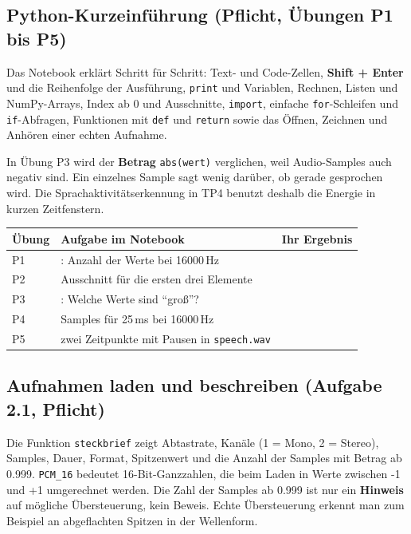 \documentclass[11pt]{article}
\begin{document}
\subsection[Python-Kurzeinführung]{Python-Kurzeinführung (Pflicht, Übungen P1 bis P5)}


Das Notebook erklärt Schritt für Schritt: Text- und Code-Zellen, \textbf{Shift + Enter} und die Reihenfolge der Ausführung, \texttt{print} und Variablen, Rechnen, Listen und NumPy-Arrays, Index ab 0 und Ausschnitte, \texttt{import}, einfache \texttt{for}-Schleifen und \texttt{if}-Abfragen, Funktionen mit \texttt{def} und \texttt{return} sowie das Öffnen, Zeichnen und Anhören einer echten Aufnahme.

In Übung P3 wird der \textbf{Betrag} \texttt{abs(wert)} verglichen, weil Audio-Samples auch negativ sind. Ein einzelnes Sample sagt wenig darüber, ob gerade gesprochen wird. Die Sprachaktivitätserkennung in TP4 benutzt deshalb die Energie in kurzen Zeitfenstern.

\begin{block}
\begin{tabularx}{\linewidth}{|L{1.4cm}|L{6.2cm}|Y|}
  \hline
  \textbf{Übung} & \textbf{Aufgabe im Notebook} & \textbf{Ihr Ergebnis} \\ \hline
  P1 & : Anzahl der Werte bei 16000\,Hz & \\ \hline
  P2 & Ausschnitt für die ersten drei Elemente & \\ \hline
  P3 & : Welche Werte sind "`groß"'? & \\ \hline
  P4 & Samples für 25\,ms bei 16000\,Hz & \\ \hline
  P5 & zwei Zeitpunkte mit Pausen in \texttt{speech.wav} & \\ \hline
\end{tabularx}
\end{block}

\subsection[Aufnahmen laden und beschreiben]{Aufnahmen laden und beschreiben (Aufgabe 2.1, Pflicht)}


Die Funktion \texttt{steckbrief} zeigt Abtastrate, Kanäle (1 = Mono, 2 = Stereo), Samples, Dauer, Format, Spitzenwert und die Anzahl der Samples mit Betrag ab 0.999. \texttt{PCM\_16} bedeutet 16-Bit-Ganzzahlen, die beim Laden in Werte zwischen -1 und +1 umgerechnet werden. Die Zahl der Samples ab 0.999 ist nur ein \textbf{Hinweis} auf mögliche Übersteuerung, kein Beweis. Echte Übersteuerung erkennt man zum Beispiel an abgeflachten Spitzen in der Wellenform.
\end{document}
